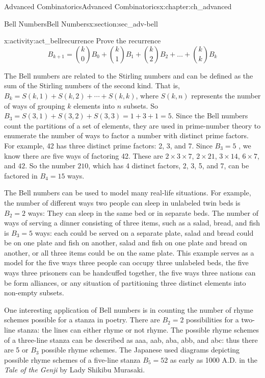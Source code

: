 \documentclass[oneside,10pt,]{book}
\numberwithin{equation}{chapter}
\begin{document}
\begin{chapterptx}{Advanced Combinatorics}{}{Advanced Combinatorics}{}{}{x:chapter:ch_advanced}
\begin{sectionptx}{Bell Numbers}{}{Bell Numbers}{}{}{x:section:sec_adv-bell}
\begin{activity}{}{x:activity:act_bellrecurrence}%
Prove the recurrence%
\begin{equation*}
B_{k + 1} = \binom{k}{0} B_{0} + \binom{k}{1} B_{1} + \binom{k}{2}B_{2} + \ldots + \binom{k}{k} B_{k}
\end{equation*}
%
\end{activity}
The Bell numbers are related to the Stirling numbers and can be defined as the sum of the Stirling numbers of the second kind. That is, \(B_{k} = S(k,1) + S(k,2) + \cdots + S(k,k)\), where \(S(k,n)\) represents the number of ways of grouping \(k\) elements into \(n\) subsets. So \(B_{3} = S(3,1) + S(3,2) + S(3,3) = 1 + 3 + 1 = 5\). Since the Bell numbers count the partitions of a set of elements, they are used in prime-number theory to enumerate the number of ways to factor a number with distinct prime factors. For example, 42 has three distinct prime factors: 2, 3, and 7. Since \(B_{3} = 5\) , we know there are five ways of factoring 42. These are \(2 \times 3 \times 7\), \(2 \times 21\), \(3 \times 14\), \(6 \times 7\), and \(42\). So the number \(210\), which has 4 distinct factors, 2, 3, 5, and 7, can be factored in \(B_{4} = 15\) ways.%
\par
The Bell numbers can be used to model many real-life situations. For example, the number of different ways two people can sleep in unlabeled twin beds is \(B_{2} = 2\) ways: They can sleep in the same bed or in separate beds. The number of ways of serving a dinner consisting of three items, such as a salad, bread, and fish is \(B_{3} = 5\) ways: each could be served on a separate plate, salad and bread could be on one plate and fish on another, salad and fish on one plate and bread on another, or all three items could be on the same plate. This example serves as a model for the five ways three people can occupy three unlabeled beds, the five ways three prisoners can be handcuffed together, the five ways three nations can be form alliances, or any situation of partitioning three distinct elements into non-empty subsets.%
\par
One interesting application of Bell numbers is in counting the number of rhyme schemes possible for a stanza in poetry. There are \(B_{2} = 2\) possibilities for a two-line stanza: the lines can either rhyme or not rhyme. The possible rhyme schemes of a three-line stanza can be described as aaa, aab, aba, abb, and abc: thus there are 5 or \(B_{3}\) possible rhyme schemes. The Japanese used diagrams depicting possible rhyme schemes of a five-line stanza \(B_{5} = 52\) as early as 1000 A.D. in the \emph{Tale of the Genji} by Lady Shikibu Murasaki.%

\end{sectionptx}
\end{chapterptx}
\end{document}
